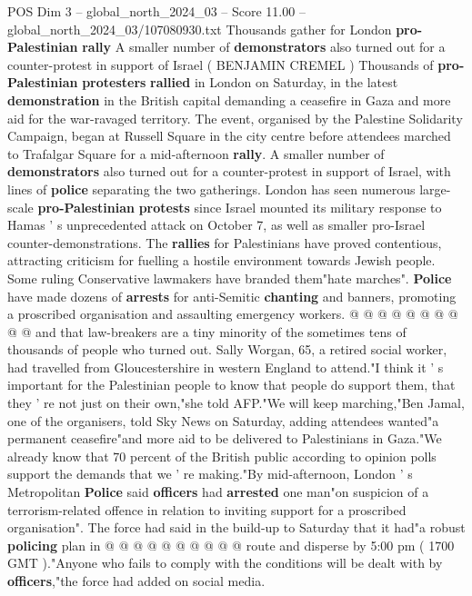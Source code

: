 \begin{textsample}{POS Dim 3 – global\_north\_2024\_03 – Score 11.00 – global\_north\_2024\_03/107080930.txt}  \label{ex:f3_pos_274}
Thousands gather for London \textbf{pro-Palestinian} \textbf{rally} A smaller number of \textbf{demonstrators} also turned out for a counter-protest in support of Israel ( BENJAMIN CREMEL ) Thousands of \textbf{pro-Palestinian} \textbf{protesters} \textbf{rallied} in London on Saturday, in the latest \textbf{demonstration} in the British capital demanding a ceasefire in Gaza and more aid for the war-ravaged territory.
The event, organised by the Palestine Solidarity Campaign, began at Russell Square in the city centre before attendees marched to Trafalgar Square for a mid-afternoon \textbf{rally}.
A smaller number of \textbf{demonstrators} also turned out for a counter-protest in support of Israel, with lines of \textbf{police} separating the two gatherings.
London has seen numerous large-scale \textbf{pro-Palestinian} \textbf{protests} since Israel mounted its military response to Hamas ' s unprecedented attack on October 7, as well as smaller pro-Israel counter-demonstrations.
The \textbf{rallies} for Palestinians have proved contentious, attracting criticism for fuelling a hostile environment towards Jewish people.
Some ruling Conservative lawmakers have branded them"hate marches". \textbf{Police} have made dozens of \textbf{arrests} for anti-Semitic \textbf{chanting} and banners, promoting a proscribed organisation and assaulting emergency workers. @ @ @ @ @ @ @ @ @ @ and that law-breakers are a tiny minority of the sometimes tens of thousands of people who turned out.
Sally Worgan, 65, a retired social worker, had travelled from Gloucestershire in western England to attend."I think it ' s important for the Palestinian people to know that people do support them, that they ' re not just on their own,"she told AFP."We will keep marching,"Ben Jamal, one of the organisers, told Sky News on Saturday, adding attendees wanted"a permanent ceasefire"and more aid to be delivered to Palestinians in Gaza."We already know that 70 percent of the British public according to opinion polls support the demands that we ' re making."By mid-afternoon, London ' s Metropolitan \textbf{Police} said \textbf{officers} had \textbf{arrested} one man"on suspicion of a terrorism-related offence in relation to inviting support for a proscribed organisation".
The force had said in the build-up to Saturday that it had"a robust \textbf{policing} plan in @ @ @ @ @ @ @ @ @ @ route and disperse by 5:00 pm ( 1700 GMT )."Anyone who fails to comply with the conditions will be dealt with by \textbf{officers},"the force had added on social media.

\end{textsample}
